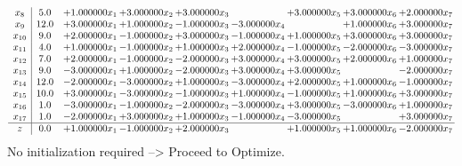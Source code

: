 \documentclass[10pt]{article}
\begin{document}
\[\begin{array}{c| c c@{\hskip 2pt} c@{\hskip 2pt} c@{\hskip 2pt} c@{\hskip 2pt} c@{\hskip 2pt} c@{\hskip 2pt} c@{\hskip 2pt} }
 x_{8}   &  5.0 & + 1.000000 x_{1} & + 3.000000 x_{2} & + 3.000000 x_{3} &   & + 3.000000 x_{5} & + 3.000000 x_{6} & + 2.000000 x_{7}\\
 x_{9}   &  12.0 & + 3.000000 x_{1} & + 1.000000 x_{2} & -1.000000 x_{3} & -3.000000 x_{4} &   & + 1.000000 x_{6} & + 3.000000 x_{7}\\
 x_{10}   &  9.0 & + 2.000000 x_{1} & -1.000000 x_{2} & + 3.000000 x_{3} & -1.000000 x_{4} & + 1.000000 x_{5} & + 3.000000 x_{6} & + 3.000000 x_{7}\\
 x_{11}   &  4.0 & + 1.000000 x_{1} & -1.000000 x_{2} & + 1.000000 x_{3} & + 2.000000 x_{4} & -1.000000 x_{5} & -2.000000 x_{6} & -3.000000 x_{7}\\
 x_{12}   &  7.0 & + 2.000000 x_{1} & -1.000000 x_{2} & -2.000000 x_{3} & + 3.000000 x_{4} & + 3.000000 x_{5} & + 2.000000 x_{6} & + 1.000000 x_{7}\\
 x_{13}   &  9.0 & -3.000000 x_{1} & + 1.000000 x_{2} & -2.000000 x_{3} & + 3.000000 x_{4} & + 3.000000 x_{5} &   & -2.000000 x_{7}\\
 x_{14}   &  12.0 & -2.000000 x_{1} & -3.000000 x_{2} & + 1.000000 x_{3} & -3.000000 x_{4} & + 2.000000 x_{5} & + 1.000000 x_{6} & -1.000000 x_{7}\\
 x_{15}   &  10.0 & + 3.000000 x_{1} & -3.000000 x_{2} & -1.000000 x_{3} & + 1.000000 x_{4} & -1.000000 x_{5} & + 1.000000 x_{6} & + 3.000000 x_{7}\\
 x_{16}   &  1.0 & -3.000000 x_{1} & -1.000000 x_{2} & -2.000000 x_{3} & -3.000000 x_{4} & + 3.000000 x_{5} & -3.000000 x_{6} & + 1.000000 x_{7}\\
 x_{17}   &  1.0 & -2.000000 x_{1} & + 3.000000 x_{2} & + 1.000000 x_{3} & -1.000000 x_{4} & -3.000000 x_{5} &   & + 3.000000 x_{7}\\
\hline
z    &  0.0 & + 1.000000 x_{1} & -1.000000 x_{2} & + 2.000000 x_{3} &   & + 1.000000 x_{5} & + 1.000000 x_{6} & -2.000000 x_{7}\\
\end{array}\]
No initialization required --> Proceed to Optimize. 
\end{document}
